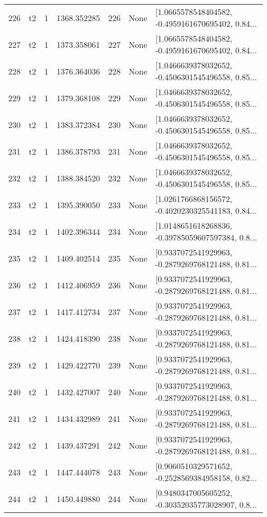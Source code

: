 \begin{tabular}{lllrlll}
226 &  t2 &   1 &  1368.352285 &  226 &  None &  [1.0665578548404582, -0.4959161670695402, 0.84... \\
227 &  t2 &   1 &  1373.358061 &  227 &  None &  [1.0665578548404582, -0.4959161670695402, 0.84... \\
228 &  t2 &   1 &  1376.364036 &  228 &  None &  [1.0466639378032652, -0.4506301545496558, 0.85... \\
229 &  t2 &   1 &  1379.368108 &  229 &  None &  [1.0466639378032652, -0.4506301545496558, 0.85... \\
230 &  t2 &   1 &  1383.372384 &  230 &  None &  [1.0466639378032652, -0.4506301545496558, 0.85... \\
231 &  t2 &   1 &  1386.378793 &  231 &  None &  [1.0466639378032652, -0.4506301545496558, 0.85... \\
232 &  t2 &   1 &  1388.384520 &  232 &  None &  [1.0466639378032652, -0.4506301545496558, 0.85... \\
233 &  t2 &   1 &  1395.390050 &  233 &  None &  [1.0261766868156572, -0.4020230325541183, 0.84... \\
234 &  t2 &   1 &  1402.396344 &  234 &  None &  [1.0148651618268836, -0.39785059607597384, 0.8... \\
235 &  t2 &   1 &  1409.402514 &  235 &  None &  [0.9337072541929963, -0.2879269768121488, 0.81... \\
236 &  t2 &   1 &  1412.406959 &  236 &  None &  [0.9337072541929963, -0.2879269768121488, 0.81... \\
237 &  t2 &   1 &  1417.412734 &  237 &  None &  [0.9337072541929963, -0.2879269768121488, 0.81... \\
238 &  t2 &   1 &  1424.418390 &  238 &  None &  [0.9337072541929963, -0.2879269768121488, 0.81... \\
239 &  t2 &   1 &  1429.422770 &  239 &  None &  [0.9337072541929963, -0.2879269768121488, 0.81... \\
240 &  t2 &   1 &  1432.427007 &  240 &  None &  [0.9337072541929963, -0.2879269768121488, 0.81... \\
241 &  t2 &   1 &  1434.432989 &  241 &  None &  [0.9337072541929963, -0.2879269768121488, 0.81... \\
242 &  t2 &   1 &  1439.437291 &  242 &  None &  [0.9337072541929963, -0.2879269768121488, 0.81... \\
243 &  t2 &   1 &  1447.444078 &  243 &  None &  [0.9060510329571652, -0.2528569384958158, 0.82... \\
244 &  t2 &   1 &  1450.449880 &  244 &  None &  [0.9480347005605252, -0.30352035773028907, 0.8... \\

\end{tabular}
